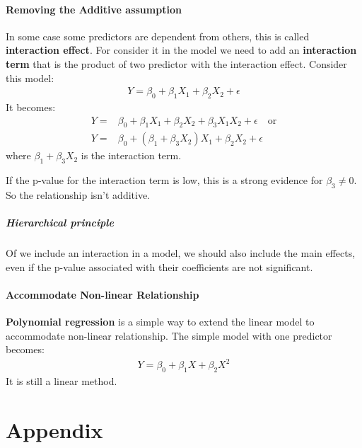 \documentclass[a4paper]{article}
\begin{document}
							\paragraph{Removing the Additive assumption}
								In some case some predictors are dependent from others, this is called \textbf{interaction effect}. For consider it in the model we need to add an \textbf{interaction term} that is the product of two predictor with the interaction effect. Consider this model:
								\begin{align*}
									Y = \beta_0 + \beta_1 X_1 + \beta_2 X_2 + \epsilon
								\end{align*}
								It becomes:
								\begin{align*}
									Y ={} & \beta_0 + \beta_1 X_1 + \beta_2 X_2 + \beta_3 X_1 X_2 + \epsilon \quad \text{or} \\
									Y ={} & \beta_0 + (\beta_1 + \beta_3 X_2) X_1 + \beta_2 X_2 + \epsilon
								\end{align*}
								where $\beta_1 + \beta_3 X_2$ is the interaction term.
								
								If the p-value for the interaction term is low, this is a strong evidence for $\beta_3 \neq 0$. So the relationship isn't additive.	
								
								\subparagraph{Hierarchical principle} Of we include an interaction in a model, we should also include the main effects, even if the p-value associated with their coefficients are not significant.							
								
							
							\paragraph{Accommodate Non-linear Relationship}																\textbf{Polynomial regression} is a simple way to extend the linear model to accommodate non-linear relationship.
								The simple model with one predictor becomes:
								\begin{align*}
									Y = \beta_0 + \beta_1 X + \beta_2 X^2
								\end{align*}
								It is still a linear method.
						
					
				
		
		
	\section{Appendix}
	
		
\end{document}
